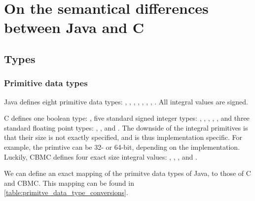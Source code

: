 \chapter{On the semantical differences between Java and C}

\section{Types}

\subsection{Primitive data types}
Java defines eight primitive data types: , 
, , , ,
, , . All integral values 
are signed.

C defines one boolean type: , five standard signed integer types: 
, , , ,
, and three standard floating point types: ,
, and  \cite[p.~40]{iso_c_standard}. The 
downside of the integral primitives is that their size is not exactly specified, 
and is thus implementation specific. For example, the  primtive can
be 32- or 64-bit, depending on the implementation. Luckily, CBMC defines four
exact size integral values: , , 
, and  \cite[p.~39]{cprover_manual}.

We can define an exact mapping of the primitve data types of Java, to those of
C and CBMC. This mapping can be found in \ref{table:primitve_data_type_conversions}.

